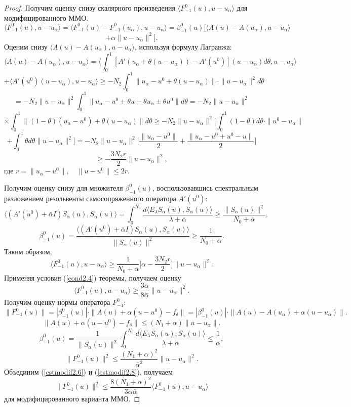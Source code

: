 \begin{proof} Получим оценку снизу скалярного произведения $\langle F_{-1}^0(u),u-u_\alpha\rangle$ для модифицированного ММО.
$$\langle F_{-1}^0(u),u-u_\alpha\rangle=\langle F_{-1}^0(u)-F_{-1}^0(u_\alpha),u-u_\alpha\rangle=\beta_{-1}^0(u)[\langle A(u)-A(u_\alpha),u-u_\alpha\rangle$$ $$+\alpha\|u-u_\alpha\|^2].$$
Оценим снизу $\langle A(u)-A(u_\alpha),u-u_\alpha\rangle$, используя формулу Лагранжа: $$\langle A(u)-A(u_\alpha),u-u_\alpha\rangle=\langle\int_{0}^{1}[A'(u_\alpha+\theta(u-u_\alpha))-A'(u^0)](u-u_\alpha)d\theta, u-u_\alpha\rangle$$ $$+\langle A'(u^0)(u-u_\alpha), u-u_\alpha\rangle\ge-N_2\int_{0}^{1}\|u_\alpha-u^0+\theta(u-u_\alpha)\|\cdot\|u-u_\alpha\|^2d\theta$$ $$=-N_2\|u-u_\alpha\|^2\int_{0}^{1}\|u_\alpha-u^0+\theta u-\theta u_\alpha\pm\theta u^0\|d\theta=-N_2\|u-u_\alpha\|^2$$
$$\times\int_{0}^{1}\|(1-\theta)(u_\alpha-u^0)+\theta(u-u_\alpha)\|d\theta\ge-N_2\|u-u_\alpha\|^2\Big[\int_{0}^{1}(1-\theta)d\theta\cdot\|u^0-u_\alpha\|$$$$+\int_{0}^{1}\theta d\theta\|u-u_\alpha\|^2\Big]=-N_2\|u-u_\alpha\|^2\Big[\frac{\|u_\alpha-u^0\|}{2}+\frac{\|u_\alpha-u^0+u^0-u\|}{2}\Big]$$
\begin{equation}\label{estmodif2.5}
\ge-\frac{3N_2r}{2}\|u-u_\alpha\|^2,
\end{equation}
где $r=\|u_\alpha-u^0\|,\quad \|u-u^0\|\le 2r$.

Получим оценку снизу для множителя $\beta_{-1}^0(u)$, воспользовавшись спектральным разложением резольвенты самосопряженного оператора $A'(u^0)$:
$$\langle (A'(u^0)+\bar{\alpha}I)S_\alpha(u), S_\alpha(u)\rangle=\int_{0}^{N_0}\frac{d\langle E_\lambda S_\alpha(u), S_\alpha(u)\rangle}{\lambda+\bar{\alpha}}\ge\frac{\|S_\alpha(u)\|^2}{N_0+\bar{\alpha}},$$
$$\beta_{-1}^0(u)=\frac{\langle (A'(u^0)+\bar{\alpha}I)S_\alpha(u), S_\alpha(u)\rangle}{\|S_\alpha(u)\|^2}\ge\frac{1}{N_0+\bar{\alpha}}.$$ 
Таким образом, $$\langle F_{-1}^0(u),u-u_\alpha\rangle\ge\frac{1}{N_0+\bar{\alpha}}\Big[\alpha-\frac{3N_2r}{2}\Big]\|u-u_\alpha\|^2.$$
Применяя условия (\ref{cond2.4}) теоремы, получаем оценку
\begin{equation}\label{estmodif2.6}
\langle F_{-1}^0(u),u-u_\alpha\rangle\ge\frac{3\alpha}{8\bar{\alpha}}\|u-u_\alpha\|^2.
\end{equation}
Получим оценку нормы оператора $F_{-1}^0$:
$$\|F_{-1}^0(u)\|=|\beta_{-1}^0(u)|\cdot\|A(u)+\alpha(u-u^0)-f_\delta\|=|\beta_{-1}^0(u)|\cdot\|A(u)-A(u_\alpha)+\alpha(u-u_\alpha)\|.$$
\begin{equation}\label{estmodif2.7}
\|A(u)+\alpha(u-u^0)-f_\delta\|\le(N_1+\alpha)\|u-u_\alpha\|.
\end{equation}
$$\beta_{-1}^0(u)=\frac{1}{\|S_\alpha(u)\|^2}\int_{0}^{N_0}\frac{d\langle E_\lambda S_\alpha(u), S_\alpha(u)\rangle}{\lambda + \bar{\alpha}}\le\frac{1}{\bar{\alpha}},$$
\begin{equation}\label{estmodif2.8}
\|F_{-1}^0(u)\|^2\le\frac{(N_1+\alpha)^2}{\bar{\alpha}^2}\|u-u_\alpha\|^2.
\end{equation}
Объединим (\ref{estmodif2.6}) и (\ref{estmodif2.8}), получаем
$$\|F_{-1}^0(u)\|^2\le\frac{8(N_1+\alpha)^2}{3\alpha\bar{\alpha}}\langle F_{-1}^0(u), u-u_\alpha\rangle$$ для модифицированного варианта ММО.


\end{proof}
